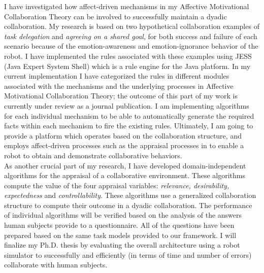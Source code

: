 \documentclass[a4paper, 11pt]{article}
\begin{document}
\begin{small}
I have investigated how affect-driven mechanisms in my Affective Motivational
Collaboration Theory can be involved to successfully maintain a dyadic
collaboration. My research is based on two hypothetical collaboration examples
of \textit{task delegation} and \textit{agreeing on a shared goal}, for both
success and failure of each scenario because of the emotion-awareness and
emotion-ignorance behavior of the robot. I have implemented the rules associated
with these examples using JESS (Java Expert System Shell) which is a rule engine
for the Java platform. In my current implementation I have categorized the rules
in different modules associated with the mechanisms and the underlying processes
in Affective Motivational Collaboration Theory; the outcome of this part of my
work is currently under review as a journal publication. I am implementing
algorithms for each individual mechanism to be able to automatically generate
the required facts within each mechanism to fire the existing rules. Ultimately,
I am going to provide a platform which operates based on the collaboration
structure, and employs affect-driven processes such as the appraisal processes
in \cite{marsella:ema-process-model} to enable a robot to obtain and demonstrate
collaborative behaviors.\\


As another crucial part of my research, I have developed domain-independent
algorithms for the appraisal of a collaborative environment. These algorithms
compute the value of the four appraisal variables: \textit{relevance,
desirability, expectedness} and \textit{controllability}. These algorithms use a
generalized collaboration structure to compute their outcome in a dyadic
collaboration. The performance of individual algorithms will be verified based
on the analysis of the answers human subjects provide to a questionnaire. All
of the questions have been prepared based on the same task models provided to
our framework. I will finalize my Ph.D. thesis by evaluating the overall
architecture using a robot simulator to successfully and efficiently (in terms
of time and number of errors) collaborate with human subjects.
\vspace*{-5mm}

\end{small}
\end{document}

